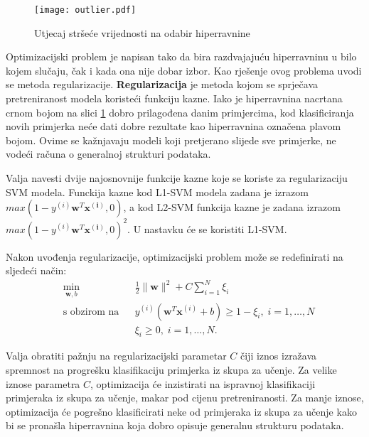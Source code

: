 \documentclass[times, utf8, zavrsni, numeric]{fer}
\begin{document}
\begin{figure}
\centering
\texttt{[image: outlier.pdf]}
\caption{Utjecaj stršeće vrijednosti na odabir hiperravnine}
\label{fig:outlier}
\end{figure}

\par Optimizacijski problem je napisan tako da bira razdvajajuću hiperravninu u bilo kojem slučaju, čak i kada
ona nije dobar izbor. Kao rješenje ovog problema uvodi se metoda regularizacije.
\textbf{Regularizacija} je metoda kojom se sprječava pretreniranost modela koristeći funkciju kazne.
Iako je hiperravnina nacrtana crnom bojom na slici \ref{fig:outlier} dobro prilagođena danim primjercima,
kod klasificiranja novih primjerka neće dati dobre rezultate kao hiperravnina označena plavom bojom.
Ovime se kažnjavaju modeli koji pretjerano slijede sve primjerke, ne vodeći računa o generalnoj strukturi 
podataka.

\par Valja navesti dvije najosnovnije funkcije kazne koje se koriste za regularizaciju SVM modela.
Funckija kazne kod L1-SVM modela zadana je izrazom $max(1 - y^{(i)}\mathbf{w}^T\mathbf{x^{(i)}}, 0)$, a
kod L2-SVM funkcija kazne je zadana izrazom $max(1 - y^{(i)}\mathbf{w}^T\mathbf{x^{(i)}}, 0)^2$.
U nastavku će se koristiti L1-SVM.

\par Nakon uvođenja regularizacije, optimizacijski problem može se redefinirati na sljedeći način:
\begin{equation}
\begin{aligned}
& \underset{\mathbf{w}, b}{\text{min}}
& & \frac{1}{2}\|\mathbf{w}\|^2 + C\sum_{i=1}^{N} \xi_i\\
& \text{s obzirom na}
& & y^{(i)}(\mathbf{w}^T\mathbf{x}^{(i)} + b) \geq 1 - \xi_i, \; i = 1, \ldots, N \\
&&& \xi_i \geq 0, \; i = 1, \ldots, N.
\end{aligned}
\label{eq:opt}
\end{equation}

Valja obratiti pažnju na regularizacijski parametar $C$ čiji iznos izražava spremnost na progrešku klasifikaciju
primjerka iz skupa za učenje.
Za velike iznose parametra $C$, optimizacija će inzistirati na ispravnoj klasifikaciji primjeraka iz skupa
za učenje, makar pod cijenu pretreniranosti. Za manje iznose, optimizacija će pogrešno klasificirati 
neke od primjeraka iz skupa za učenje kako bi se pronašla hiperravnina koja dobro opisuje generalnu strukturu
podataka.
\end{document}

